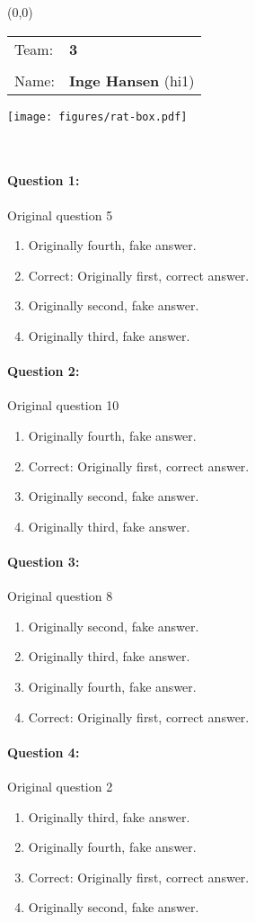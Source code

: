\documentclass[9pt, twoside, twocolumn]{extarticle}
\renewcommand{\includegraphics}[2][]{\OldIncludegraphics[width=\linewidth, #1]{#2}}
\newcommand{\individualprefix}[3]{%
\begin{textblock}{3.5}(0,0)
\fontfamily{phv}\selectfont
\begin{tabular}{ll}
Team: & \Large\linespread{6} \textbf{#3}\\
      & \\
Name: & \Large\linespread{6} \textbf{#1} (#2)
\end{tabular}

\texttt{[image: figures/rat-box.pdf]}
\end{textblock}
\textcolor{white}{.}\\ %
\vspace{6cm}
}%
\begin{document}
\individualprefix{Inge Hansen}{hi1}{3}

\paragraph{Question 1:}
Original question 5

\begin{enumerate}[label=\textbf{{\Alph*}},labelindent=0pt, labelsep=1.5em, parsep=0.2em]
\item Originally fourth, fake answer.
\item Correct: Originally first, correct answer.
\item Originally second, fake answer.
\item Originally third, fake answer.
\end{enumerate}
\paragraph{Question 2:}
Original question 10

\begin{enumerate}[label=\textbf{{\Alph*}},labelindent=0pt, labelsep=1.5em, parsep=0.2em]
\item Originally fourth, fake answer.
\item Correct: Originally first, correct answer.
\item Originally second, fake answer.
\item Originally third, fake answer.
\end{enumerate}
\paragraph{Question 3:}
Original question 8

\begin{enumerate}[label=\textbf{{\Alph*}},labelindent=0pt, labelsep=1.5em, parsep=0.2em]
\item Originally second, fake answer.
\item Originally third, fake answer.
\item Originally fourth, fake answer.
\item Correct: Originally first, correct answer.
\end{enumerate}
\paragraph{Question 4:}
Original question 2

\begin{enumerate}[label=\textbf{{\Alph*}},labelindent=0pt, labelsep=1.5em, parsep=0.2em]
\item Originally third, fake answer.
\item Originally fourth, fake answer.
\item Correct: Originally first, correct answer.
\item Originally second, fake answer.
\end{enumerate}
\end{document}
